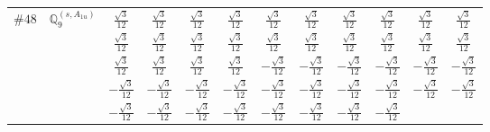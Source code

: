 \documentclass[fleqn,9pt,landscape]{jsarticle}
\begin{document}
\begin{center}
\begin{longtable}{lcccccccccc}
$ \#48\quad \mathbb{Q}_{9}^{(s,A_{1u})} $ & $ \frac{\sqrt{3}}{12} $ & $ \frac{\sqrt{3}}{12} $ & $ \frac{\sqrt{3}}{12} $ & $ \frac{\sqrt{3}}{12} $ & $ \frac{\sqrt{3}}{12} $ & $ \frac{\sqrt{3}}{12} $ & $ \frac{\sqrt{3}}{12} $ & $ \frac{\sqrt{3}}{12} $ & $ \frac{\sqrt{3}}{12} $ & $ \frac{\sqrt{3}}{12} $ \\
& $ \frac{\sqrt{3}}{12} $ & $ \frac{\sqrt{3}}{12} $ & $ \frac{\sqrt{3}}{12} $ & $ \frac{\sqrt{3}}{12} $ & $ \frac{\sqrt{3}}{12} $ & $ \frac{\sqrt{3}}{12} $ & $ \frac{\sqrt{3}}{12} $ & $ \frac{\sqrt{3}}{12} $ & $ \frac{\sqrt{3}}{12} $ & $ \frac{\sqrt{3}}{12} $ \\
& $ \frac{\sqrt{3}}{12} $ & $ \frac{\sqrt{3}}{12} $ & $ \frac{\sqrt{3}}{12} $ & $ \frac{\sqrt{3}}{12} $ & $ - \frac{\sqrt{3}}{12} $ & $ - \frac{\sqrt{3}}{12} $ & $ - \frac{\sqrt{3}}{12} $ & $ - \frac{\sqrt{3}}{12} $ & $ - \frac{\sqrt{3}}{12} $ & $ - \frac{\sqrt{3}}{12} $ \\
& $ - \frac{\sqrt{3}}{12} $ & $ - \frac{\sqrt{3}}{12} $ & $ - \frac{\sqrt{3}}{12} $ & $ - \frac{\sqrt{3}}{12} $ & $ - \frac{\sqrt{3}}{12} $ & $ - \frac{\sqrt{3}}{12} $ & $ - \frac{\sqrt{3}}{12} $ & $ - \frac{\sqrt{3}}{12} $ & $ - \frac{\sqrt{3}}{12} $ & $ - \frac{\sqrt{3}}{12} $ \\
& $ - \frac{\sqrt{3}}{12} $ & $ - \frac{\sqrt{3}}{12} $ & $ - \frac{\sqrt{3}}{12} $ & $ - \frac{\sqrt{3}}{12} $ & $ - \frac{\sqrt{3}}{12} $ & $ - \frac{\sqrt{3}}{12} $ & $ - \frac{\sqrt{3}}{12} $ & $ - \frac{\sqrt{3}}{12} $ & $  $ & $  $ \\
\end{longtable}
\end{center}
\newpage
\end{document}
